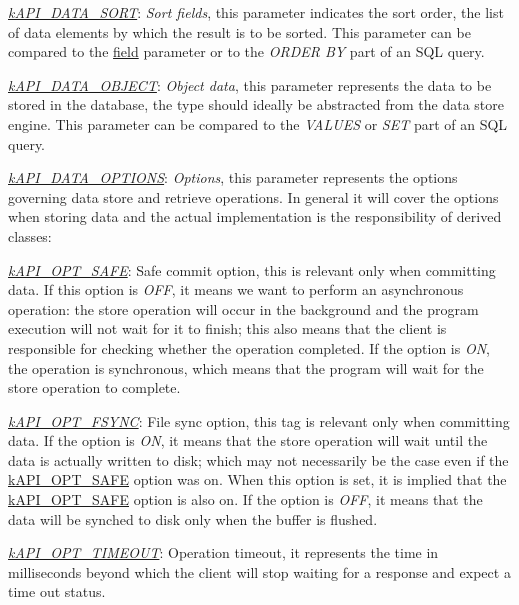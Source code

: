 \begin{DoxyItemize}
\begin{DoxyItemize}
\item {\itshape \hyperlink{}{k\-A\-P\-I\-\_\-\-D\-A\-T\-A\-\_\-\-S\-O\-R\-T}}\-: {\itshape Sort fields}, this parameter indicates the sort order, the list of data elements by which the result is to be sorted. This parameter can be compared to the \hyperlink{}{field} parameter or to the {\itshape O\-R\-D\-E\-R B\-Y} part of an S\-Q\-L query. 
\item {\itshape \hyperlink{}{k\-A\-P\-I\-\_\-\-D\-A\-T\-A\-\_\-\-O\-B\-J\-E\-C\-T}}\-: {\itshape Object data}, this parameter represents the data to be stored in the database, the type should ideally be abstracted from the data store engine. This parameter can be compared to the {\itshape V\-A\-L\-U\-E\-S} or {\itshape S\-E\-T} part of an S\-Q\-L query. 
\item {\itshape \hyperlink{}{k\-A\-P\-I\-\_\-\-D\-A\-T\-A\-\_\-\-O\-P\-T\-I\-O\-N\-S}}\-: {\itshape Options}, this parameter represents the options governing data store and retrieve operations. In general it will cover the options when storing data and the actual implementation is the responsibility of derived classes\-: 
\begin{DoxyItemize}
\item {\itshape \hyperlink{}{k\-A\-P\-I\-\_\-\-O\-P\-T\-\_\-\-S\-A\-F\-E}}\-: Safe commit option, this is relevant only when committing data. If this option is {\itshape O\-F\-F}, it means we want to perform an asynchronous operation\-: the store operation will occur in the background and the program execution will not wait for it to finish; this also means that the client is responsible for checking whether the operation completed. If the option is {\itshape O\-N}, the operation is synchronous, which means that the program will wait for the store operation to complete. 
\item {\itshape \hyperlink{}{k\-A\-P\-I\-\_\-\-O\-P\-T\-\_\-\-F\-S\-Y\-N\-C}}\-: File sync option, this tag is relevant only when committing data. If the option is {\itshape O\-N}, it means that the store operation will wait until the data is actually written to disk; which may not necessarily be the case even if the \hyperlink{}{k\-A\-P\-I\-\_\-\-O\-P\-T\-\_\-\-S\-A\-F\-E} option was on. When this option is set, it is implied that the \hyperlink{}{k\-A\-P\-I\-\_\-\-O\-P\-T\-\_\-\-S\-A\-F\-E} option is also on. If the option is {\itshape O\-F\-F}, it means that the data will be synched to disk only when the buffer is flushed. 
\item {\itshape \hyperlink{}{k\-A\-P\-I\-\_\-\-O\-P\-T\-\_\-\-T\-I\-M\-E\-O\-U\-T}}\-: Operation timeout, it represents the time in milliseconds beyond which the client will stop waiting for a response and expect a time out status. 

\end{DoxyItemize}
\end{DoxyItemize}
\end{DoxyItemize}
